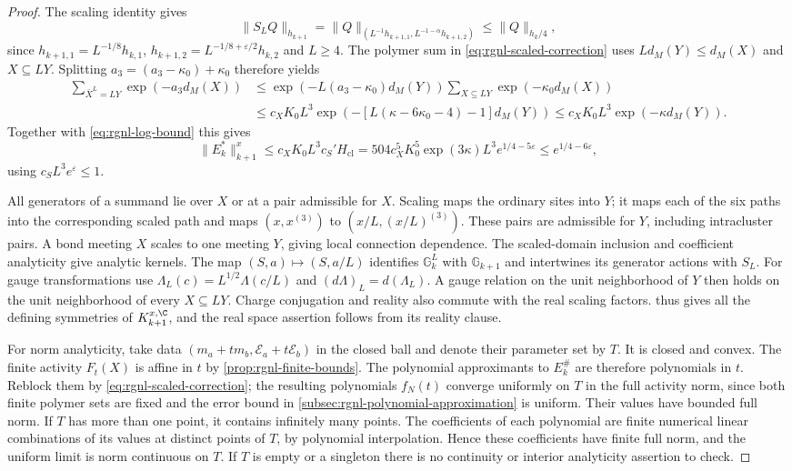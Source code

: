 \begin{proof}
The scaling identity gives
\[
 \|S_LQ\|_{h_{k+1}}
   =\|Q\|_{(L^{-1}h_{k+1,1},L^{-1-\alpha}h_{k+1,2})}
   \le\|Q\|_{h_k/4},
\]
since $h_{k+1,1}=L^{-1/8}h_{k,1}$,
$h_{k+1,2}=L^{-1/8+\varepsilon/2}h_{k,2}$ and $L\ge4$.
The polymer sum in \eqref{eq:rgnl-scaled-correction}
uses $Ld_M(Y)\le d_M(X)$ and $X\subseteq LY$.
Splitting $a_3=(a_3-\kappa_0)+\kappa_0$ therefore yields
\begin{align*}
 \sum_{\bar X^L=LY}\exp(-a_3d_M(X))
  &\le \exp(-L(a_3-\kappa_0)d_M(Y))
                         \sum_{X\subseteq LY}\exp(-\kappa_0d_M(X))\\
  &\le c_XK_0L^3
                  \exp(-[L(\kappa-6\kappa_0-4)-1]d_M(Y))
   \le c_XK_0L^3\exp(-\kappa d_M(Y)).
\end{align*}
Together with \eqref{eq:rgnl-log-bound} this gives
\[
 \|E_k^*\|_{k+1}^x
  \le c_XK_0L^3c_S'H_{\mathrm{cl}}
  =504c_X^5K_0^5\exp(3\kappa)L^3e^{1/4-5\varepsilon}
  \le e^{1/4-6\varepsilon},
\]
using $c_SL^3e^\varepsilon\le1$.

All generators of a summand lie over $X$ or at a pair
admissible for $X$. Scaling maps the ordinary sites
into $Y$; it maps each of the six paths into the
corresponding scaled path and maps
$(x,x^{(3)})$ to $(x/L,(x/L)^{(3)})$.
These pairs are admissible for $Y$, including
intracluster pairs. A bond meeting $X$ scales to
one meeting $Y$, giving local connection dependence.
The scaled-domain inclusion and coefficient analyticity
give analytic kernels.
The map $(S,a)\mapsto(S,a/L)$ identifies
$\mathbb G_k^L$ with $\mathbb G_{k+1}$ and intertwines
its generator actions with $S_L$. For gauge transformations
use $\Lambda_L(c)=L^{1/2}\Lambda(c/L)$ and
$(d\Lambda)_L=d(\Lambda_L)$.
A gauge relation on the unit neighborhood of $Y$
then holds on the unit neighborhood of every
$X\subseteq LY$. Charge conjugation and reality also
commute with the real scaling factors.
 thus gives all the
defining symmetries of $K_{k+1}^{x,\C}$, and the real
space assertion follows from its reality clause.

For norm analyticity, take data
$(m_a+t m_b,\mathscr E_a+t\mathscr E_b)$ in the closed
ball and denote their parameter set by $T$.
It is closed and convex. The finite activity $F_t(X)$
is affine in $t$ by \cref{prop:rgnl-finite-bounds}.
The polynomial approximants to $E_k^\#$ are therefore
polynomials in $t$. Reblock them by
\eqref{eq:rgnl-scaled-correction}; the resulting polynomials
$f_N(t)$ converge uniformly on $T$ in the full activity
norm, since both finite polymer sets are fixed and the
error bound in \cref{subsec:rgnl-polynomial-approximation} is uniform.
Their values have bounded full norm.
If $T$ has more than one point, it contains infinitely
many points. The coefficients of each polynomial are
finite numerical linear combinations of its values at
distinct points of $T$, by polynomial interpolation.
Hence these coefficients have finite full norm, and the
uniform limit is norm continuous on $T$.
If $T$ is empty or a singleton there is no continuity
or interior analyticity assertion to check.


\end{proof}
